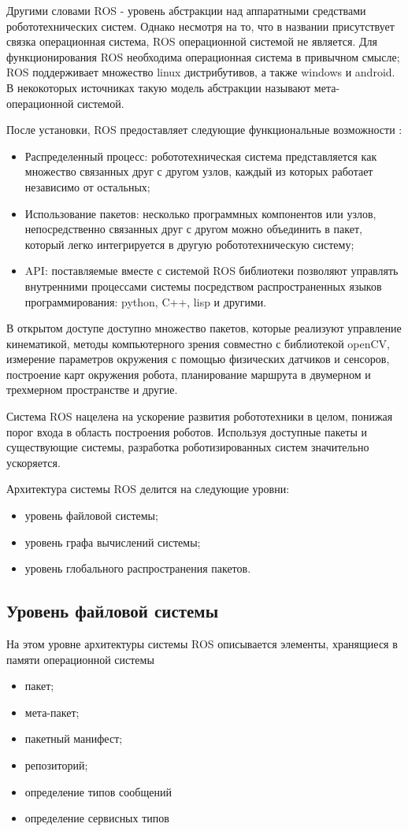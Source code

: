 \documentclass[oneside,final,14pt]{extreport}
\begin{document}
Другими словами ROS -  уровень абстракции над аппаратными средствами робототехнических систем. Однако несмотря на то, что в названии присутствует связка операционная система, ROS операционной системой не является. Для функционирования ROS необходима операционная система в привычном смысле; ROS поддерживает множество linux дистрибутивов, а также windows и android.  В некокоторых источниках такую модель абстракции называют мета-операционной системой.

После установки, ROS предоставляет следующие функциональные возможности \cite{RosBookTurtle}: 
\begin{itemize}
\item Распределенный процесс: робототехническая система представляется как множество связанных друг с другом узлов, каждый из которых работает независимо от остальных;
\item Использование пакетов: несколько программных компонентов или узлов, непосредственно связанных друг с другом можно объединить в пакет, который легко интегрируется в другую робототехническую систему;
\item API: поставляемые вместе с системой ROS библиотеки позволяют управлять внутренними процессами системы посредством распространенных языков программирования: python, C++, lisp и другими.
\end{itemize}

В открытом доступе доступно множество пакетов, которые реализуют управление кинематикой, методы компьютерного зрения совместно с библиотекой openCV, измерение параметров окружения с помощью физических датчиков и сенсоров, построение карт окружения робота, планирование маршрута в двумерном и трехмерном пространстве и другие.

Система ROS нацелена на ускорение развития робототехники в целом, понижая порог входа в область построения роботов. Используя доступные пакеты и существующие системы, разработка роботизированных систем значительно ускоряется. 

Архитектура системы ROS делится на следующие уровни:
\begin{itemize}
\item уровень файловой системы;
\item уровень графа вычислений системы;
\item уровень глобального распространения пакетов.
\end{itemize}

\subsection{Уровень файловой системы}
На этом уровне архитектуры системы ROS описывается элементы, хранящиеся в памяти операционной системы
\begin{itemize}
\item пакет;
\item мета-пакет;
\item пакетный манифест;
\item репозиторий;
\item определение типов сообщений
\item определение сервисных типов 
\end{itemize}
\end{document}
